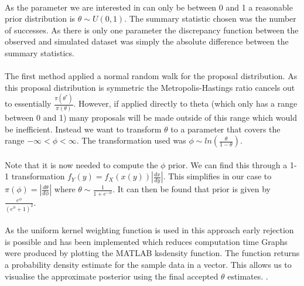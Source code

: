 \documentclass[12,fleqn]{article}
\theoremstyle{definition}
\theoremstyle{plain}
\begin{document}
\paragraph{}
As the parameter we are interested in can only be between 0 and 1 a reasonable prior distribution is $\theta \sim U(0,1)$. The summary statistic chosen was the number of successes. As there is only one parameter the discrepancy function between the observed and simulated dataset was simply the absolute difference between the summary statistics.
\par

\paragraph{}
The first method applied a normal random walk for the proposal distribution. As this proposal distribution is symmetric the Metropolis-Hastings ratio cancels out to essentially $\frac{\pi(\theta^*)}{\pi(\theta)}$. However, if applied directly to theta (which only has a range between 0 and 1) many proposals will be made outside of this range which would be inefficient. Instead we want to transform $\theta$ to a parameter that covers the range $-\infty < \phi < \infty$. The transformation used was $\phi \sim  ln(\frac{\theta}{1 - \theta})$.
\par

\paragraph{}
Note that it is now needed to compute the $\phi$ prior. We can find this through a 1-1 transformation $f_Y(y) = f_X(x(y)) \left| \frac{dx}{dy} \right|$. This simplifies in our case to $\pi(\phi) = \left| \frac{d\theta}{d\phi} \right|$ where $\theta \sim \frac{1}{1 + e^{-\phi}}$. It can then be found that prior is given by $\frac{e^{\phi}}{(e^{\phi} + 1)^2}$.
\par

\paragraph{}
 As the uniform kernel weighting function is used in this approach early rejection is possible and has been implemented which reduces computation time Graphs were produced by plotting the MATLAB ksdensity function. The function returns a probability density estimate for the sample data in a vector. This allows us to visualise the approximate posterior using the final accepted $\theta$ estimates. .
\par
\end{document}
